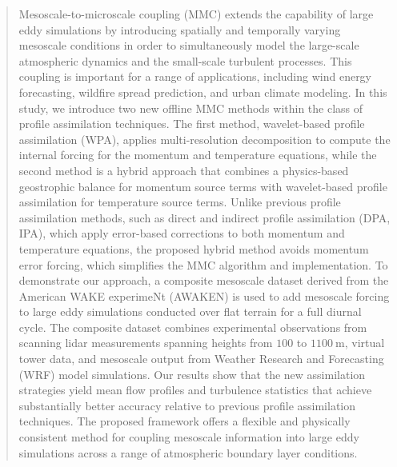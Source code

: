 \date{Received: DD Month YEAR / Accepted: DD Month YEAR}

\maketitle

\begin{abstract}
Mesoscale-to-microscale coupling (MMC) extends the capability of large eddy simulations by introducing spatially and temporally varying mesoscale conditions in order to simultaneously model the large-scale atmospheric dynamics and the small-scale turbulent processes. This coupling is important for a range of applications, including wind energy forecasting, wildfire spread prediction, and urban climate modeling. In this study, we introduce two new offline MMC methods within the class of profile assimilation techniques. The first method, wavelet-based profile assimilation (WPA), applies multi-resolution decomposition to compute the internal forcing for the momentum and temperature equations, while the second method is a hybrid approach that combines a physics-based geostrophic balance for momentum source terms with wavelet-based profile assimilation for temperature source terms. Unlike previous profile assimilation methods, such as direct and indirect profile assimilation (DPA, IPA), which apply error-based corrections to both momentum and temperature equations, the proposed hybrid method avoids momentum error forcing, which simplifies the MMC algorithm and implementation. To demonstrate our approach, a composite mesoscale dataset derived from the American WAKE experimeNt (AWAKEN) is used to add mesoscale forcing to large eddy simulations conducted over flat terrain for a full diurnal cycle. The composite dataset combines experimental observations from scanning lidar measurements spanning heights from $100$ to $1100~\mathrm{m}$, virtual tower data, and mesoscale output from Weather Research and Forecasting (WRF) model simulations. Our results show that the new assimilation strategies yield mean flow profiles and turbulence statistics that achieve substantially better accuracy relative to previous profile assimilation techniques. The proposed framework offers a flexible and physically consistent method for coupling mesoscale information into large eddy simulations across a range of atmospheric boundary layer conditions.

\end{abstract}

